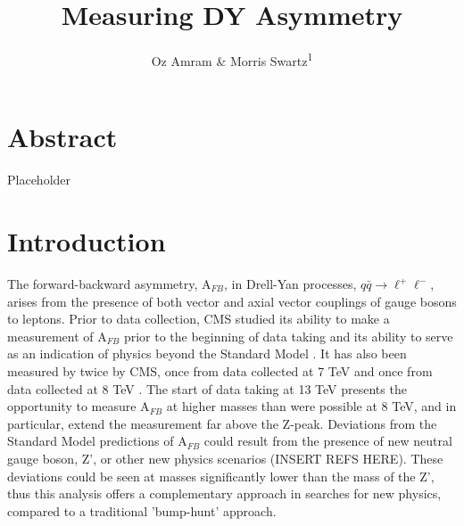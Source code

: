 \documentclass[
    10pt, %
    a4paper, %
    oneside, %
    headinclude,footinclude, %
    BCOR5mm, %
]{scrartcl}
\title{Measuring DY Asymmetry} %
\author{Oz Amram \& Morris Swartz\textsuperscript{1}} %
\date{} %
\begin{document}
\maketitle %

\setcounter{tocdepth}{2} %

\tableofcontents %



\section*{Abstract} %
Placeholder



{\let\thefootnote\relax{}}



\newpage %


\section{Introduction}

The forward-backward asymmetry, A$_{FB}$, in Drell-Yan processes, $q\bar q\to\ell^+\ell^-$,  arises from the presence of both vector 
and axial vector couplings of gauge bosons to leptons. Prior to data collection, CMS studied its ability to
make a measurement of A$_{FB}$ prior to the beginning of data taking and its ability to serve as an indication of physics beyond the Standard 
Model \cite{Cousins:2005uf}. 
It has also been measured by twice by CMS, once from data collected at 7 TeV
\cite{CMS:AFB_7TeV} and 
once from data collected at 8 TeV \cite{CMS:AFB_8TeV}. 
The start of
data taking at 13 TeV presents the opportunity to measure A$_{FB}$ at higher masses than were possible at 8 TeV,
and in particular, extend the measurement far above the Z-peak. 
Deviations from the Standard Model predictions of A$_{FB}$ could result from the presence of new neutral gauge boson, Z', 
or other new physics scenarios (INSERT REFS HERE). These deviations could be seen at masses significantly lower than the 
mass of the Z', thus this analysis offers a complementary approach in searches for new physics, compared to a traditional 'bump-hunt' approach. \\
\end{document}
